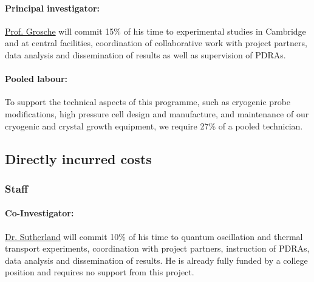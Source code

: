 \documentclass[prl,a4paper,11pt]{revtex4-2}
\begin{document}
\begin{singlespace}
\paragraph{Principal investigator:}
\ul{Prof. Grosche} will commit 15\% of his time to
experimental studies in Cambridge and at central facilities, coordination of collaborative work with project partners, data analysis and dissemination of
results as well as supervision of PDRAs.

\paragraph{Pooled labour:}
To support the technical aspects of this programme, such as
cryogenic probe modifications, high pressure cell design and manufacture, and maintenance of our cryogenic and crystal growth equipment, 
we require 27\% of a pooled technician.


\subsection{Directly incurred costs}
\subsubsection{Staff}
\paragraph{Co-Investigator:}
\ul{Dr. Sutherland} will commit 10\% of his time to quantum oscillation and thermal transport experiments, coordination with pro\-ject partners, instruction of PDRAs, data analysis and dissemination of
results. He is already fully funded by a college position and requires no support from this project.


\end{singlespace}
\end{document}
